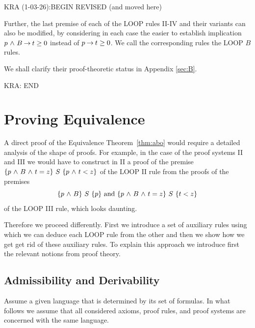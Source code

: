 \documentclass[manuscript, screen, review]{acmart}
\begin{document}


KRA (1-03-26):BEGIN REVISED (and moved here)

Further, the last premise of each of the LOOP rules II-IV and their
variants can also be modified, by considering in each case the easier
to establish implication $p \mbox{$\ \wedge\ $} B \mbox{$\:\rightarrow\:$} t \geq 0$ instead of
$p \mbox{$\:\rightarrow\:$} t \geq 0$.  We call the corresponding rules the LOOP $B$ rules.

We shall clarify their proof-theoretic status in Appendix \ref{sec:B}.

KRA: END 



\section{Proving Equivalence}

A direct proof of the Equivalence Theorem~\ref{thm:abo} would require a detailed
analysis of the shape of proofs. For example, in the case of the proof
systems II and III we would have to construct in II a proof of the premise
$ \mbox{$\{{p \mbox{$\ \wedge\ $} B \mbox{$\ \wedge\ $} t=z}\}\ {S}\ \{{p \mbox{$\ \wedge\ $} t<z}\}$}$ of the LOOP II rule from the proofs
of the premises 
\[
 \mbox{$\{{p \mbox{$\ \wedge\ $} B}\}\ {S}\ \{{p}\}$} \mbox{ and } \mbox{$\{{p \mbox{$\ \wedge\ $} B \mbox{$\ \wedge\ $} t=z}\}\ {S}\ \{{t<z}\}$}
\]
of the LOOP III rule, which looks daunting.

Therefore we proceed differently. First we introduce a set of
auxiliary rules using which we can deduce each LOOP rule from the
other and then we show how we get get rid of these auxiliary rules.
To explain this approach we introduce first the relevant notions from
proof theory.


\subsection{Admissibility and Derivability}

Assume a given language that is determined by its set of formulas.  In
what follows we assume that all considered axioms, proof rules, and
proof systems are concerned with the same language.
\end{document}
